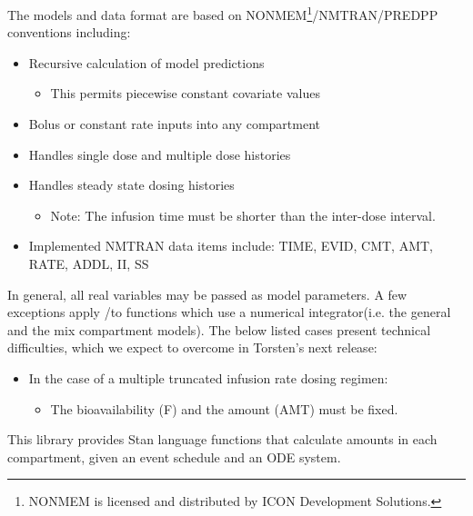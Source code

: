 \documentclass[11pt, reqno, oneside]{amsbook}
\numberwithin{equation}{chapter}
\numberwithin{figure}{chapter}
\numberwithin{table}{chapter}
\theoremstyle{remark}
\begin{document}
The models and data format are based on
NONMEM\textregistered{}\footnote{NONMEM\textregistered{} is licensed and distributed by ICON Development Solutions.}/NMTRAN/PREDPP
conventions including:
\begin{itemize}
\item Recursive calculation of model predictions
\begin{itemize}
\item This permits piecewise constant covariate values
\end{itemize}
\item Bolus or constant rate inputs into any compartment
\item Handles single dose and multiple dose histories
\item Handles steady state dosing histories
\begin{itemize}
\item Note: The infusion time must be shorter than the inter-dose interval.
\end{itemize}
\item Implemented NMTRAN data items include: TIME, EVID, CMT, AMT, RATE, ADDL, II, SS
\end{itemize}

In general, all real variables may be passed as model parameters. A
few exceptions apply /to functions which use a numerical
integrator(i.e. the general and the mix compartment
models). The below listed cases present technical difficulties, which we expect to
overcome in Torsten's next release:
\begin{itemize}
\item In the case of a multiple truncated infusion rate dosing regimen:
\begin{itemize}
\item The bioavailability (F) and the amount (AMT) must be fixed.
\end{itemize}
\end{itemize}

This library provides Stan language functions that calculate amounts
in each compartment, given an event schedule and an ODE system.
\end{document}
